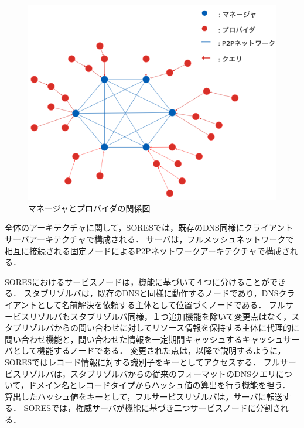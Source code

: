 \begin{figure}[bh]
 \centering
 \includegraphics[scale=0.5]{figure/manager-provider.png}
 \caption{マネージャとプロバイダの関係図}
 \label{fig:manager-provider}
\end{figure}

全体のアーキテクチャに関して，SORESでは，既存のDNS同様にクライアントサーバアーキテクチャで構成される．
サーバは，フルメッシュネットワークで相互に接続される固定ノードによるP2Pネットワークアーキテクチャで構成される．

SORESにおけるサービスノードは，機能に基づいて４つに分けることができる．
スタブリゾルバは，既存のDNSと同様に動作するノードであり，DNSクライアントとして名前解決を依頼する主体として位置づくノードである．
フルサービスリゾルバもスタブリゾルバ同様，１つ追加機能を除いて変更点はなく，スタブリゾルバからの問い合わせに対してリソース情報を保持する主体に代理的に問い合わせ機能と，問い合わせた情報を一定期間キャッシュするキャッシュサーバとして機能するノードである．
変更された点は，以降で説明するように，SORESではレコード情報に対する識別子をキーとしてアクセスする．
フルサービスリゾルバは，スタブリゾルバからの従来のフォーマットのDNSクエリについて，ドメイン名とレコードタイプからハッシュ値の算出を行う機能を担う．
算出したハッシュ値をキーとして，フルサービスリゾルバは，サーバに転送する．
SORESでは，権威サーバが機能に基づき二つサービスノードに分割される．


